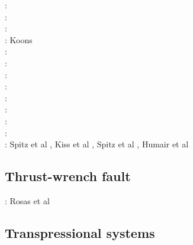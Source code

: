 \begin{scriptsize}
\nineteeneightythree: \cite{stoc83}\cite{dasd83}\\
\nineteeneightyfour: \cite{dahl84}\cite{dasd84}\\
\nineteenninety: \cite{dahl90}\\
\nineteenninetyfour: Koons \cite{koon94}\\
\twothousandthree: \cite{wiep03}\cite{smbs03}\cite{muso03}\cite{vamf03}\\
\twothousandsix: \cite{simp06}\cite{yabm06}\\
\twothousandtwelve: \cite{rukb12}\\
\twothousandthirteen: \cite{rugb13}\\
\twothousandsixteen: \cite{mauw16}\\
\twothousandseventeen: \cite{mauw17}\cite{rugb17}\\
\twothousandeighteen: \cite{weib18}\\
\twothousandnineteen: \cite{elgb19}\cite{meho19}\cite{meho19b}\\
\twothousandtwenty: Spitz et al \cite{spsk20}, Kiss et al \cite{kids20}, Spitz et al \cite{spbe20}, Humair et al \cite{hube20}
\end{scriptsize}

\subsection{Thrust-wrench fault} 

\begin{scriptsize}
\twothousandfifteen: Rosas et al \cite{rods15}
\end{scriptsize}

\subsection{Transpressional systems} 

